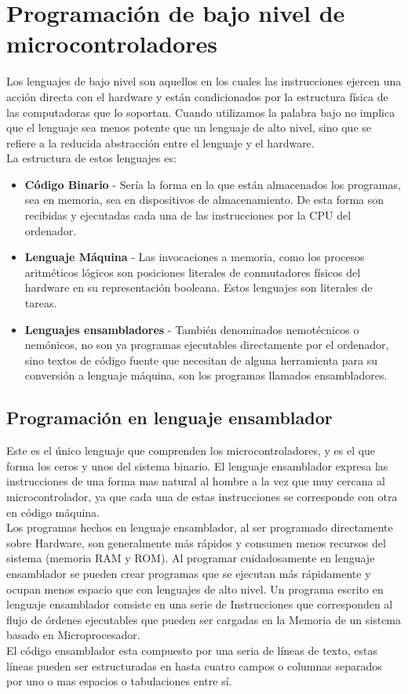 \documentclass[12pt,a4paper]{article}
\begin{document}
   \section{Programación de bajo nivel de microcontroladores}
   Los lenguajes de bajo nivel son aquellos en los cuales las instrucciones ejercen una acción directa con el hardware y están condicionados por la estructura física de las computadoras que lo soportan. Cuando utilizamos la palabra bajo no implica que el lenguaje sea menos potente que un lenguaje de alto nivel, sino que se refiere a la reducida abstracción entre el lenguaje y el hardware\cite{Muha}. \\
   
   La estructura de estos lenguajes es:
   \begin{itemize}
   		\item \textbf{Código Binario} - Sería la forma en la que están almacenados los programas, sea en memoria, sea en dispositivos de almacenamiento. De esta forma son recibidas y ejecutadas cada una de las instrucciones por la CPU del ordenador.
   		\item \textbf{Lenguaje Máquina} - Las invocaciones a memoria, como los procesos aritméticos lógicos son posiciones literales de conmutadores físicos del hardware en su representación booleana. Estos lenguajes son literales de tareas.
   		\item \textbf{Lenguajes ensambladores} - También denominados nemotécnicos o nemónicos, no son ya programas ejecutables directamente por el ordenador, sino textos de código fuente que necesitan de alguna herramienta para su conversión a lenguaje máquina, son los programas llamados ensambladores.
   \end{itemize}
   
   \subsection{Programación en lenguaje ensamblador}   
   Este es el único lenguaje que comprenden los microcontroladores, y es el que forma los ceros y unos del sistema binario. El lenguaje ensamblador expresa las instrucciones de una forma mas natural al hombre a la vez que muy cercana al microcontrolador, ya que cada una de estas instrucciones se corresponde con otra en código máquina.\\
   Los programas hechos en lenguaje ensamblador, al ser programado directamente sobre Hardware, son generalmente más rápidos y consumen menos recursos del sistema (memoria RAM y ROM). Al programar cuidadosamente en lenguaje ensamblador se pueden crear programas que se ejecutan más rápidamente y ocupan menos espacio que con lenguajes de alto nivel. Un programa escrito en lenguaje ensamblador consiste en una serie de Instrucciones que corresponden al flujo de órdenes ejecutables que pueden ser cargadas en la Memoria de un sistema basado en Microprocesador. \\
   El código ensamblador esta compuesto por una seria de líneas de texto, estas líneas pueden ser estructuradas en hasta cuatro campos o columnas separados por uno o mas espacios o tabulaciones entre sí.\\
   
\end{document}
